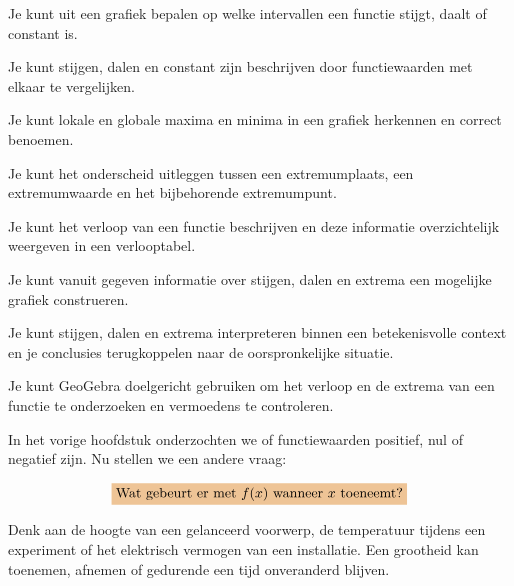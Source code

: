 \documentclass{ximera}
\begin{document}
\begin{leerdoelen}

  \item Je kunt uit een grafiek bepalen op welke intervallen een functie stijgt, daalt of constant is.

  \item Je kunt stijgen, dalen en constant zijn beschrijven door functiewaarden met elkaar te vergelijken.

  \item Je kunt lokale en globale maxima en minima in een grafiek herkennen en correct benoemen.

  \item Je kunt het onderscheid uitleggen tussen een extremumplaats, een extremumwaarde en het bijbehorende extremumpunt.

  \item Je kunt het verloop van een functie beschrijven en deze informatie overzichtelijk weergeven in een verlooptabel.

  \item Je kunt vanuit gegeven informatie over stijgen, dalen en extrema een mogelijke grafiek construeren.

  \item Je kunt stijgen, dalen en extrema interpreteren binnen een betekenisvolle context en je conclusies terugkoppelen naar de oorspronkelijke situatie.

  \item Je kunt GeoGebra doelgericht gebruiken om het verloop en de extrema van een functie te onderzoeken en vermoedens te controleren.

\end{leerdoelen}


In het vorige hoofdstuk onderzochten we of functiewaarden positief, nul of negatief zijn.
Nu stellen we een andere vraag:

\[
\important{\text{Wat gebeurt er met }f(x)\text{ wanneer }x\text{ toeneemt?}}
\]

Denk aan de hoogte van een gelanceerd voorwerp, de temperatuur tijdens een experiment
of het elektrisch vermogen van een installatie. Een grootheid kan toenemen, afnemen
of gedurende een tijd onveranderd blijven.

\begin{center}
\end{center}
\end{document}
